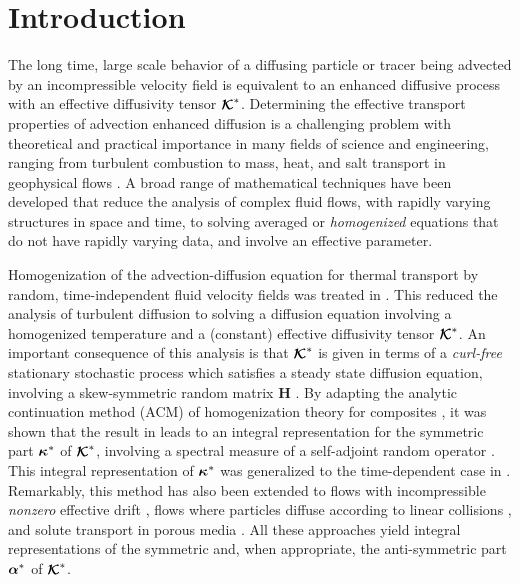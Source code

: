 \documentclass[11pt]{amsart}
\newcommand{\Hb}{\mathbf{H}}
\newcommand\Kbc{\mbox{\boldmath${\mathcal{K}}$}}
\newcommand\balpha{\mbox{\boldmath${\alpha}$}}
\newcommand\bkappa{\mbox{\boldmath${\kappa}$}}
\begin{document}
\section{Introduction}\label{sec:Introduction}
%
The long time, large scale behavior of a diffusing particle   
or tracer being advected by an incompressible velocity field 
is equivalent to an enhanced diffusive process \cite{Taylor:PRSL:196} 
with an effective diffusivity tensor $\Kbc^*$.
Determining the effective transport properties of advection enhanced
diffusion is a challenging problem with theoretical and practical 
importance in many fields of science and engineering,
ranging from turbulent combustion to mass, heat, and salt transport in
geophysical flows \cite{Moffatt:RPP:621}. A broad range of
mathematical techniques have been developed that reduce the analysis
of complex fluid flows, with rapidly varying structures in space and
time, to solving averaged or \textit{homogenized} equations that do
not have rapidly varying data, and involve an effective parameter.



Homogenization of the advection-diffusion equation for thermal
transport by random, time-independent fluid velocity fields was
treated in \cite{McLaughlin:SIAM_JAM:780}. This 
reduced the analysis of turbulent diffusion to solving a
diffusion equation involving a homogenized temperature and a
(constant) effective diffusivity tensor $\Kbc^*$. An important
consequence of this analysis is that $\Kbc^*$ is given in terms  
of a \emph{curl-free} stationary stochastic process which satisfies a
steady state diffusion equation, involving a skew-symmetric random
matrix $\Hb$ \cite{Avellaneda:CMP-339,Avellaneda:PRL-753}. By adapting
the analytic continuation method (ACM) of homogenization theory for
composites \cite{Golden:CMP-473}, it was shown that the result in
\cite{McLaughlin:SIAM_JAM:780} leads to an integral
representation for the symmetric part $\bkappa^*$ of $\Kbc^*$,
involving a spectral measure of a self-adjoint random
operator \cite{Avellaneda:CMP-339,Avellaneda:PRL-753}. This integral
representation of $\bkappa^*$ was generalized to the time-dependent
case in \cite{Avellaneda:PRE:3249,Biferale:PF:2725}. Remarkably, this 
method has also been extended to flows with incompressible
\emph{nonzero} effective drift \cite{Pavliotis:PHD_Thesis}, flows
where particles diffuse according to linear collisions
\cite{Pavliotis:IMAJAM:951}, and solute transport in porous media
\cite{Bhattacharya:AAP:1999:951}. All these approaches yield integral
representations of the symmetric and, when appropriate, the
anti-symmetric part $\balpha^*$ of $\Kbc^*$. 
\end{document}
